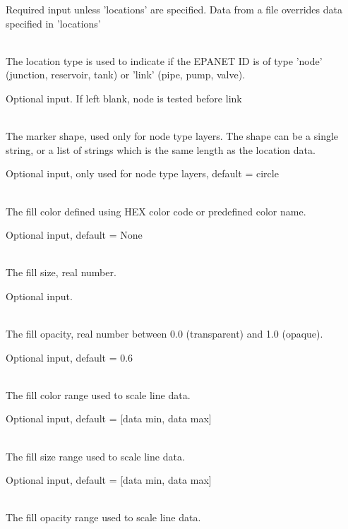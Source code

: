 \begin{description}[topsep=0pt,parsep=0.5em,itemsep=-0.4em]
\begin{description}[topsep=0pt,parsep=0.5em,itemsep=-0.4em]
\begin{description}[topsep=0pt,parsep=0.5em,itemsep=-0.4em]
                Required input unless 'locations' are specified.  
                Data from a file overrides data specified in 'locations'
      \item[{location type}]\hfill
\\The location type is used to indicate if the EPANET ID is of type 'node' 
                (junction, reservoir, tank) or 'link' (pipe, pump, valve).
                
                Optional input. If left blank, node is tested before link
      \item[{shape}]\hfill
\\The marker shape, used only for node type layers. The shape can
                be a single string, or a list of strings which is the same 
                length as the location data.
                
				Optional input, only used for node type layers, default = circle
      \item[{fill}]\hfill
      \begin{description}[topsep=0pt,parsep=0.5em,itemsep=-0.4em]
        \item[{color}]\hfill
\\The fill color defined using HEX color code or predefined color name.
                
                Optional input, default = None
        \item[{size}]\hfill
\\The fill size, real number.
                
                Optional input.
        \item[{opacity}]\hfill
\\The fill opacity, real number between 0.0 (transparent) and 1.0 (opaque).
                
                Optional input, default = 0.6
        \item[{color range}]\hfill
\\The fill color range used to scale line data.
                
                Optional input, default = [data min, data max]
        \item[{size range}]\hfill
\\The fill size range used to scale line data.
                
                Optional input, default = [data min, data max]
        \item[{opacity range}]\hfill
\\The fill opacity range used to scale line data.
                

\end{description}
\end{description}
\end{description}
\end{description}
